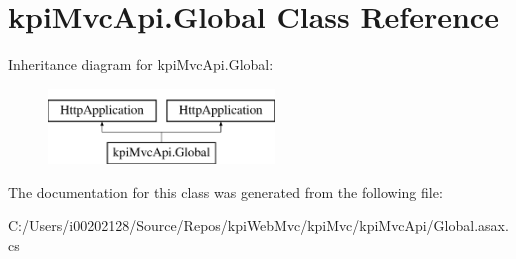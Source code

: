 \hypertarget{classkpi_mvc_api_1_1_global}{}\section{kpi\+Mvc\+Api.\+Global Class Reference}
\label{classkpi_mvc_api_1_1_global}
Inheritance diagram for kpi\+Mvc\+Api.\+Global\+:\begin{figure}[H]
\begin{center}
\leavevmode
\includegraphics[height=2.000000cm]{classkpi_mvc_api_1_1_global}
\end{center}
\end{figure}


The documentation for this class was generated from the following file\+:\begin{DoxyCompactItemize}
\item 
C\+:/\+Users/i00202128/\+Source/\+Repos/kpi\+Web\+Mvc/kpi\+Mvc/kpi\+Mvc\+Api/Global.\+asax.\+cs\end{DoxyCompactItemize}
